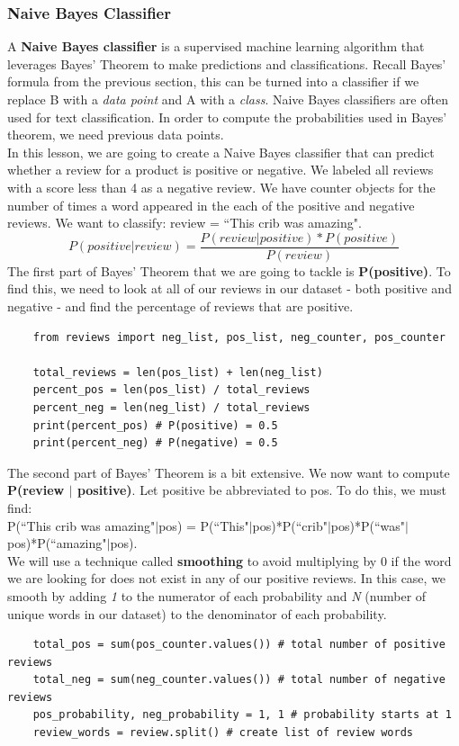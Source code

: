 \documentclass[11pt, a4paper]{article}
\begin{document}
\begin{spacing}{1.1}
	\subsubsection{Naive Bayes Classifier}
	A \textbf{Naive Bayes classifier} is a supervised machine learning algorithm that leverages Bayes’ Theorem to make predictions and classifications. Recall Bayes' formula from the previous section, this can be turned into a classifier if we replace B with a \textit{data point} and A with a \textit{class}. Naive Bayes classifiers are often used for text classification. In order to compute the probabilities used in Bayes’ theorem, we need previous data points. \vspace*{1.5mm} \\
	In this lesson, we are going to create a Naive Bayes classifier that can predict whether a review for a product is positive or negative. We labeled all reviews with a score less than 4 as a negative review. We have counter objects for the number of times a word appeared in the each of the positive and negative reviews. We want to classify: review = ``This crib was amazing". $$ P(positive | review) = \frac{P(review | positive) * P(positive)}{P(review)} $$
	The first part of Bayes’ Theorem that we are going to tackle is \textbf{P(positive)}. To find this, we need to look at all of our reviews in our dataset - both positive and negative - and find the percentage of reviews that are positive.
	\begin{lstlisting}
	from reviews import neg_list, pos_list, neg_counter, pos_counter

	total_reviews = len(pos_list) + len(neg_list)
	percent_pos = len(pos_list) / total_reviews
	percent_neg = len(neg_list) / total_reviews
	print(percent_pos) # P(positive) = 0.5
	print(percent_neg) # P(negative) = 0.5 \end{lstlisting} \vspace*{1mm}
	The second part of Bayes’ Theorem is a bit extensive. We now want to compute \textbf{P(review $|$ positive)}. Let positive be abbreviated to pos. To do this, we must find: \\ P(“This crib was amazing"$|$pos) = P(“This"$|$pos)*P(“crib"$|$pos)*P(“was"$|$pos)*P(“amazing"$|$pos). \vspace*{1.5mm} \\
	We will use a technique called \textbf{smoothing} to avoid multiplying by 0 if the word we are looking for does not exist in any of our positive reviews. In this case, we smooth by adding \textit{1} to the numerator of each probability and \textit{N} (number of unique words in our dataset) to the denominator of each probability. 
	\begin{lstlisting}
	total_pos = sum(pos_counter.values()) # total number of positive reviews
	total_neg = sum(neg_counter.values()) # total number of negative reviews
	pos_probability, neg_probability = 1, 1 # probability starts at 1
	review_words = review.split() # create list of review words
	

\end{lstlisting}
\end{spacing}
\end{document}
